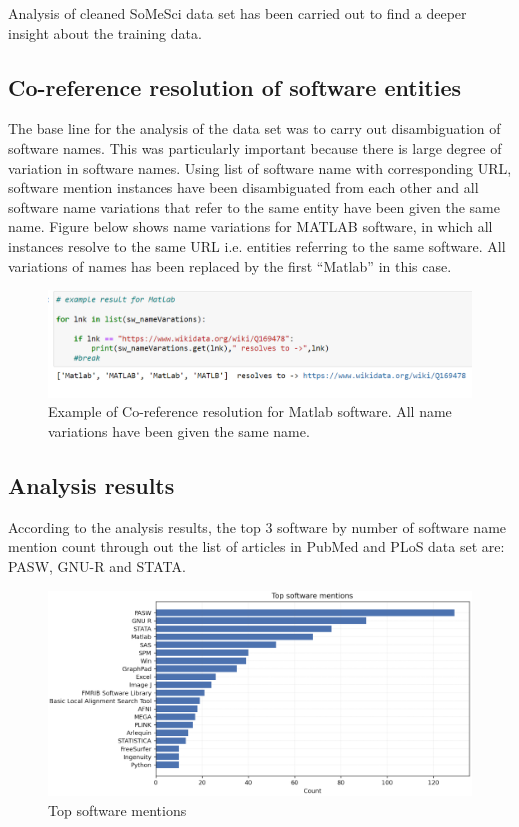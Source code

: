 Analysis of cleaned SoMeSci data set has been carried out to find a deeper insight about the training data. 

\subsection{Co-reference resolution of software entities }
\label{subsec:dataset:Analysis:resolution}

The base line for the analysis of the data set was to carry out disambiguation of software names. This was particularly important because there is large degree of variation in software names. Using list of software name with corresponding URL, software mention instances have been disambiguated from each other and all software name variations that refer to the same entity have been given the same name. Figure below shows name variations for MATLAB software, in which all instances resolve to the same URL i.e. entities referring to the same software. All variations of names has been replaced by the first “Matlab” in this case.

\begin{figure}[htbp]
	\centering
	\includegraphics[width=.95\textwidth]{4.graphics/figures/chap4/Corefresolution}
	\caption{Example of Co-reference resolution for Matlab software. All name variations have been given the same name.}
	\label{fig:chapter04:setup}
\end{figure}


\subsection{Analysis results }
\label{subsec:dataset:Analysis:results}

According to the analysis results, the top 3 software by number of software name mention count through out the list of articles in PubMed and PLoS data set are: PASW, GNU-R and STATA.  

\begin{figure}[htbp]
	\centering
	\includegraphics[width=1\textwidth]{4.graphics/figures/analysisresults/1.Top software mentions}
	\caption{Top software mentions}
	\label{fig:chapter03:setup}
\end{figure}

